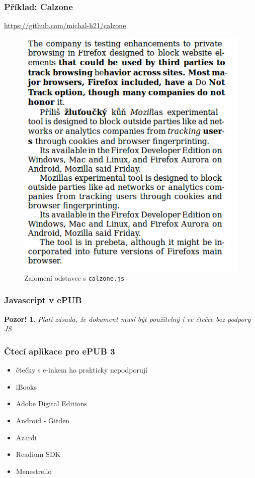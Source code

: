 \documentclass[czech]{beamer}
\newtheorem{pozor}{Pozor!}
\begin{document}
\begin{frame}
        \frametitle{Příklad: Calzone }
\url{https://github.com/michal-h21/calzone}
\begin{figure}
  \includegraphics[width=.6\textwidth]{examples/with-calzone.png}
  \caption{Zalomení odstavce s \texttt{calzone.js}}
  \end{figure}
\end{frame}
\begin{frame}
  \frametitle{Javascript v ePUB}
\begin{pozor}
        Platí zásada, že dokument musí být použitelný i ve čtečce bez podpory JS
      \end{pozor}
\end{frame}
\begin{frame}
  \frametitle{Čtecí aplikace pro ePUB 3}
  \begin{itemize}
  \item čtečky s e-inkem ho prakticky nepodporují
  \item iBooks
  \item Adobe Digital Editions
  \item Android - Gitden
  \item Azardi
  \item Readium SDK
  \item Menestrello
\end{itemize}
\end{frame}
\end{document}
